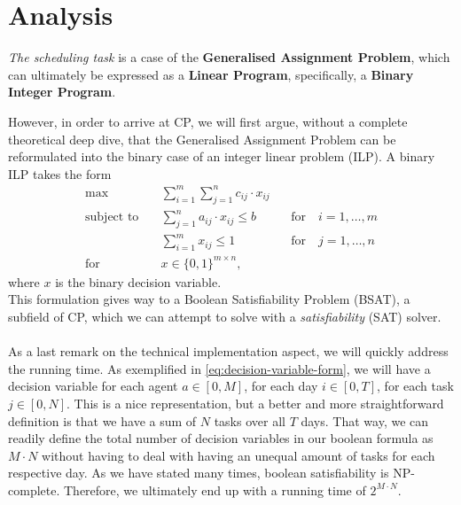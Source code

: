 \section{Analysis}
\textit{The scheduling task} is a case of the \textbf{Generalised Assignment Problem}\cite{Wiki-general-assignment-prob}, which can ultimately be expressed as a \textbf{Linear Program}\cite{Wiki-linear-programming}, specifically, a \textbf{Binary Integer Program}.

However, in order to arrive at CP, we will first argue, without a complete theoretical deep dive, that the Generalised Assignment Problem can be reformulated into the binary case of an integer linear problem (ILP). A binary ILP takes the form\cite{Integer-Programming-Book} 
\begin{align*}
    \text{max} \quad &\sum_{i = 1}^m \sum_{j = 1}^n c_{ij} \cdot x_{ij}
    \\
    \text{subject to} \quad &\sum_{j = 1}^n a_{ij} \cdot x_{ij} \leq b \qquad &\text{for} \quad i = 1, \hdots, m
    \\
    &\sum_{i = 1}^m x_{ij} \leq 1 \qquad &\text{for} \quad j = 1, \hdots, n
    \\
    \text{for} \quad &x \in \{0, 1\}^{m \times n},
\end{align*}
where $x$ is the binary decision variable.
\\
This formulation gives way to a Boolean Satisfiability Problem (BSAT), a subfield of CP, which we can attempt to solve with a \textit{satisfiability} (SAT) solver.
\\
\\
As a last remark on the technical implementation aspect, we will quickly address the running time. As exemplified in \autoref{eq:decision-variable-form}, we will have a decision variable for each agent \(a \in [0, M]\), for each day \(i \in [0, T]\), for each task \(j \in [0, N]\). This is a nice representation, but a better and more straightforward definition is that we have a sum of \(N\) tasks over all \(T\) days. That way, we can readily define the total number of decision variables in our boolean formula as \(M \cdot N\) without having to deal with having an unequal amount of tasks for each respective day. As we have stated many times, boolean satisfiability is NP-complete. Therefore, we ultimately end up with a running time of \(2^{M \cdot N}\).